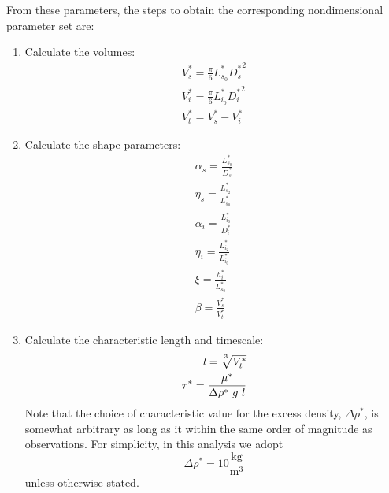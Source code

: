 \documentclass[10pt,a4paper]{article}
\def\non{\nonumber}
\def\l{\mathit{l}}
\begin{document}
From these parameters, the steps to obtain the corresponding nondimensional parameter set are:
\begin{enumerate}
	\item Calculate the volumes:
	\begin{eqnarray}\label{d2ndpars2}
		V_s^* = \frac{\pi}{6} L_{s_0}^* {D_s^*}^2 \non \\
		V_i^* = \frac{\pi}{6} L_{i_0}^* {D_i^*}^2 \non \\
		V_t^* = V_s^* - V_i^* 
	\end{eqnarray}
	\item Calculate the shape parameters: %
	\begin{eqnarray}\label{d2ndpars1}
		\alpha_s = \frac{L^*_{s_0}}{D^*_s} \non \\
		\eta_s = \frac{L^*_{s_2}}{L^*_{s_0}} \non \\
		\alpha_{i} = \frac{L^*_{i_0}}{D^*_i} \non \\
		\eta_{i} = \frac{L^*_{i_2}}{L^*_{i_0}} \non \\
		\xi = \frac{h_i^*}{L_{s_0}^*} \non \\
		\beta = \frac{V_s^*}{V_t^*}
	\end{eqnarray}
	\item Calculate the characteristic length and timescale:
	\begin{eqnarray}\label{d2ndpars3}
		\l = \sqrt[\uproot{5}3]{V_t^*} \non \\
		\tau^* = \frac{\mu^*}{\Delta \rho^* ~ g ~ l}
	\end{eqnarray}
	\color{red}
	Note that the choice of characteristic value for the excess density, $\Delta \rho^*$, is somewhat arbitrary as long as it within the same order of magnitude as observations.
	For simplicity, in this analysis we adopt
	\begin{equation}
		\Delta \rho^* = 10 \frac{\mathrm{kg}}{\mathrm{m^3}}
	\end{equation}
	unless otherwise stated.

\end{enumerate}
\end{document}
